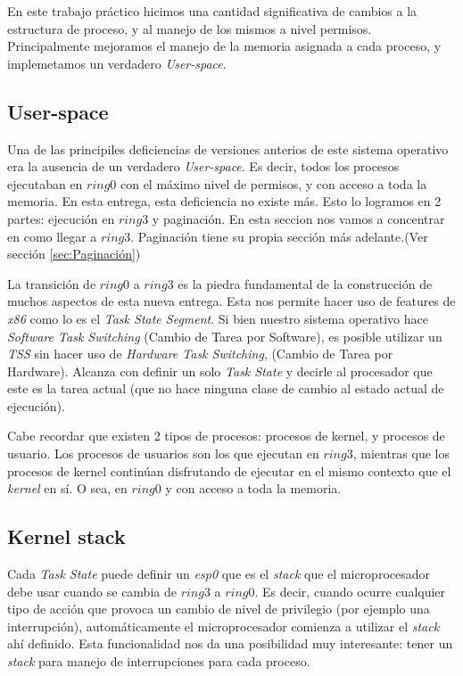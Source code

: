 \documentclass[a4paper,10pt]{article}
\begin{document}
En este trabajo práctico hicimos una cantidad significativa de cambios a la estructura de proceso, y al manejo de los mismos a nivel permisos.
Principalmente mejoramos el manejo de la memoria asignada a cada proceso, y implemetamos un verdadero \textit{User-space}.

\subsection{User-space}
Una de las principiles deficiencias de versiones anterios de este sistema operativo era la ausencia de un verdadero \textit{User-space}.
Es decir, todos los procesos ejecutaban en $ring 0$ con el máximo nivel de permisos, y con acceso a toda la memoria.
En esta entrega, esta deficiencia no existe más.
Esto lo logramos en 2 partes: ejecución en $ring 3$ y paginación.
En esta seccion nos vamos a concentrar en como llegar a $ring 3$. 
Paginación tiene su propia sección más adelante.(Ver sección \ref{sec:Paginación})

La transición de $ring 0$ a $ring 3$ es la piedra fundamental de la construcción de muchos aspectos de esta nueva entrega.
Esta nos permite hacer uso de features de \textit{x86} como lo es el \textit{Task State Segment}.
Si bien nuestro sistema operativo hace \textit{Software Task Switching} (Cambio de Tarea por Software), es posible utilizar un \textit{TSS} sin hacer uso de 
\textit{Hardware Task Switching}, (Cambio de Tarea por Hardware).
Alcanza con definir un solo \textit{Task State} y decirle al procesador que este es la tarea actual 
(que no hace ninguna clase de cambio al estado actual de ejecución).

Cabe recordar que existen 2 tipos de procesos: procesos de kernel, y procesos de usuario.
Los procesos de usuarios son los que ejecutan en $ring 3$, mientras que los procesos de kernel continúan disfrutando de ejecutar en el mismo contexto 
que el \textit{kernel} en sí. O sea, en $ring 0$ y con acceso a toda la memoria.

\subsection{Kernel stack}

Cada \textit{Task State} puede definir un \textit{esp0} que es el \textit{stack} que el microprocesador debe usar cuando se cambia de $ring 3$ a $ring 0$.
Es decir, cuando ocurre cualquier tipo de acción que provoca un cambio de nivel de privilegio (por ejemplo una interrupción), automáticamente el microprocesador 
comienza a utilizar el \textit{stack} ahí definido.
Esta funcionalidad nos da una posibilidad muy interesante: tener un \textit{stack} para manejo de interrupciones para cada proceso.
\end{document}
